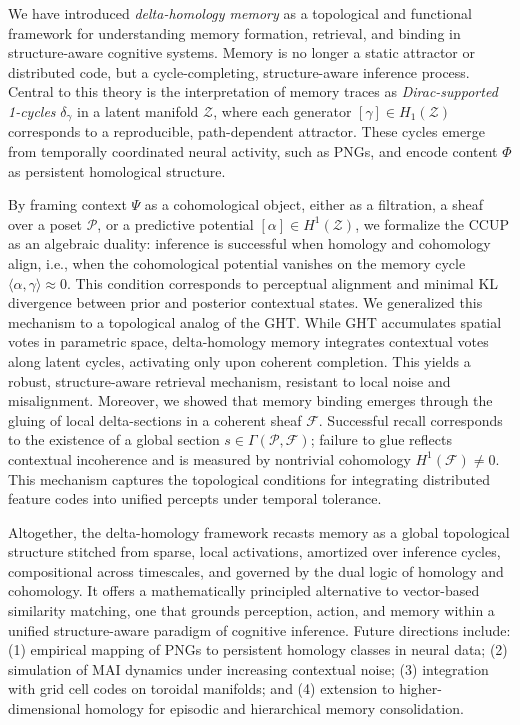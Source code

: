 \documentclass[lettersize,journal]{IEEEtran}
\begin{document}
We have introduced \emph{delta-homology memory} as a topological and functional framework for understanding memory formation, retrieval, and binding in structure-aware cognitive systems. Memory is no longer a static attractor or distributed code, but a cycle-completing, structure-aware inference process. Central to this theory is the interpretation of memory traces as \emph{Dirac-supported 1-cycles} \( \delta_\gamma \) in a latent manifold \( \mathcal{Z} \), where each generator \( [\gamma] \in H_1(\mathcal{Z}) \) corresponds to a reproducible, path-dependent attractor. These cycles emerge from temporally coordinated neural activity, such as PNGs, and encode content \( \Phi \) as persistent homological structure.

By framing context \( \Psi \) as a cohomological object, either as a filtration, a sheaf over a poset \( \mathcal{P} \), or a predictive potential \( [\alpha] \in H^1(\mathcal{Z}) \), we formalize the CCUP as an algebraic duality: inference is successful when homology and cohomology align, i.e., when the cohomological potential vanishes on the memory cycle \( \langle \alpha, \gamma \rangle \approx 0 \). This condition corresponds to perceptual alignment and minimal KL divergence between prior and posterior contextual states.
We generalized this mechanism to a topological analog of the GHT. While GHT accumulates spatial votes in parametric space, delta-homology memory integrates contextual votes along latent cycles, activating only upon coherent completion. This yields a robust, structure-aware retrieval mechanism, resistant to local noise and misalignment.
Moreover, we showed that memory binding emerges through the gluing of local delta-sections in a coherent sheaf \( \mathcal{F} \). Successful recall corresponds to the existence of a global section \( s \in \Gamma(\mathcal{P}, \mathcal{F}) \); failure to glue reflects contextual incoherence and is measured by nontrivial cohomology \( H^1(\mathcal{F}) \ne 0 \). This mechanism captures the topological conditions for integrating distributed feature codes into unified percepts under temporal tolerance.

Altogether, the delta-homology framework recasts memory as a global topological structure stitched from sparse, local activations, amortized over inference cycles, compositional across timescales, and governed by the dual logic of homology and cohomology. It offers a mathematically principled alternative to vector-based similarity matching, one that grounds perception, action, and memory within a unified structure-aware paradigm of cognitive inference.
Future directions include: (1) empirical mapping of PNGs to persistent homology classes in neural data; (2) simulation of MAI dynamics under increasing contextual noise; (3) integration with grid cell codes on toroidal manifolds; and (4) extension to higher-dimensional homology for episodic and hierarchical memory consolidation.
\end{document}
